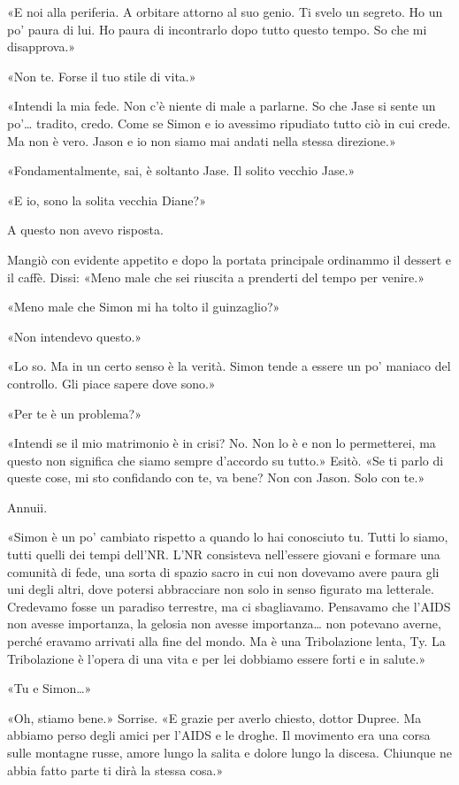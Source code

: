 «E noi alla periferia. A orbitare attorno al suo genio. Ti svelo un
segreto. Ho un po' paura di lui. Ho paura di incontrarlo dopo tutto
questo tempo. So che mi disapprova.»

«Non te. Forse il tuo stile di vita.»

«Intendi la mia fede. Non c'è niente di male a parlarne. So che Jase si
sente un po'\ldots{} tradito, credo. Come se Simon e io avessimo
ripudiato tutto ciò in cui crede. Ma non è vero. Jason e io non siamo
mai andati nella stessa direzione.»

«Fondamentalmente, sai, è soltanto Jase. Il solito vecchio Jase.»

«E io, sono la solita vecchia Diane?»

A questo non avevo risposta.

Mangiò con evidente appetito e dopo la portata principale ordinammo il
dessert e il caffè. Dissi: «Meno male che sei riuscita a prenderti del
tempo per venire.»

«Meno male che Simon mi ha tolto il guinzaglio?»

«Non intendevo questo.»

«Lo so. Ma in un certo senso è la verità. Simon tende a essere un po'
maniaco del controllo. Gli piace sapere dove sono.»

«Per te è un problema?»

«Intendi se il mio matrimonio è in crisi? No. Non lo è e non lo
permetterei, ma questo non significa che siamo sempre d'accordo su
tutto.» Esitò. «Se ti parlo di queste cose, mi sto confidando con te, va
bene? Non con Jason. Solo con te.»

Annuii.

«Simon è un po' cambiato rispetto a quando lo hai conosciuto tu. Tutti
lo siamo, tutti quelli dei tempi dell'NR. L'NR consisteva nell'essere
giovani e formare una comunità di fede, una sorta di spazio sacro in cui
non dovevamo avere paura gli uni degli altri, dove potersi abbracciare
non solo in senso figurato ma letterale. Credevamo fosse un paradiso
terrestre, ma ci sbagliavamo. Pensavamo che l'AIDS non avesse
importanza, la gelosia non avesse importanza\ldots{} non potevano
averne, perché eravamo arrivati alla fine del mondo. Ma è una
Tribolazione lenta, Ty. La Tribolazione è l'opera di una vita e per lei
dobbiamo essere forti e in salute.»

«Tu e Simon\ldots»

«Oh, stiamo bene.» Sorrise. «E grazie per averlo chiesto, dottor Dupree.
Ma abbiamo perso degli amici per l'AIDS e le droghe. Il movimento era
una corsa sulle montagne russe, amore lungo la salita e dolore lungo la
discesa. Chiunque ne abbia fatto parte ti dirà la stessa cosa.»

